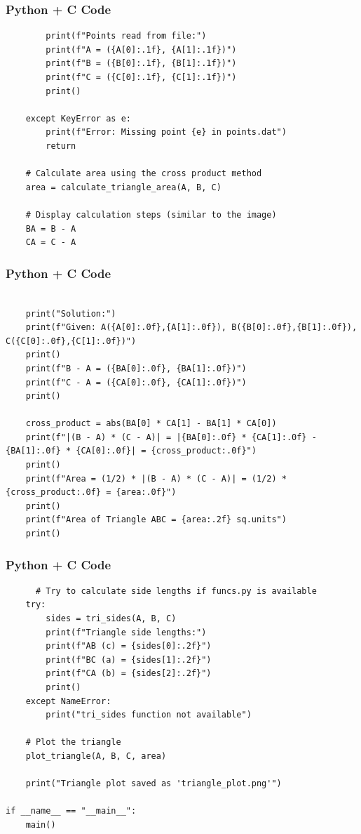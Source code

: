 \documentclass{beamer}
\begin{document}
\begin{frame}[fragile]
    \frametitle{Python + C Code}
    \begin{lstlisting}   
        print(f"Points read from file:")
        print(f"A = ({A[0]:.1f}, {A[1]:.1f})")
        print(f"B = ({B[0]:.1f}, {B[1]:.1f})")
        print(f"C = ({C[0]:.1f}, {C[1]:.1f})")
        print()
        
    except KeyError as e:
        print(f"Error: Missing point {e} in points.dat")
        return
    
    # Calculate area using the cross product method
    area = calculate_triangle_area(A, B, C)
    
    # Display calculation steps (similar to the image)
    BA = B - A
    CA = C - A
    \end{lstlisting}
\end{frame}

\begin{frame}[fragile]
    \frametitle{Python + C Code}
    \begin{lstlisting}
      
    print("Solution:")
    print(f"Given: A({A[0]:.0f},{A[1]:.0f}), B({B[0]:.0f},{B[1]:.0f}), C({C[0]:.0f},{C[1]:.0f})")
    print()
    print(f"B - A = ({BA[0]:.0f}, {BA[1]:.0f})")
    print(f"C - A = ({CA[0]:.0f}, {CA[1]:.0f})")
    print()
    
    cross_product = abs(BA[0] * CA[1] - BA[1] * CA[0])
    print(f"|(B - A) * (C - A)| = |{BA[0]:.0f} * {CA[1]:.0f} - {BA[1]:.0f} * {CA[0]:.0f}| = {cross_product:.0f}")
    print()
    print(f"Area = (1/2) * |(B - A) * (C - A)| = (1/2) * {cross_product:.0f} = {area:.0f}")
    print()
    print(f"Area of Triangle ABC = {area:.2f} sq.units")
    print()
    \end{lstlisting}
\end{frame}

\begin{frame}[fragile]
    \frametitle{Python + C Code}
    \begin{lstlisting}
      # Try to calculate side lengths if funcs.py is available
    try:
        sides = tri_sides(A, B, C)
        print(f"Triangle side lengths:")
        print(f"AB (c) = {sides[0]:.2f}")
        print(f"BC (a) = {sides[1]:.2f}")
        print(f"CA (b) = {sides[2]:.2f}")
        print()
    except NameError:
        print("tri_sides function not available")
    
    # Plot the triangle
    plot_triangle(A, B, C, area)
    
    print("Triangle plot saved as 'triangle_plot.png'")

if __name__ == "__main__":
    main() 
    \end{lstlisting}
\end{frame}
\end{document}
